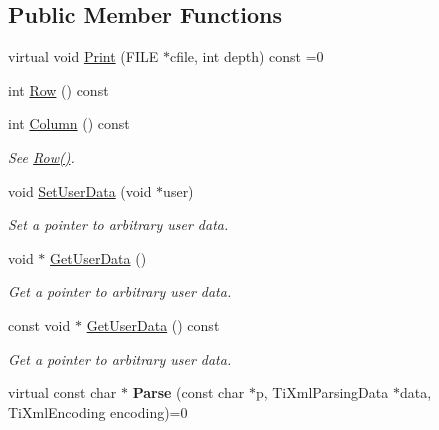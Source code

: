 \subsection*{Public Member Functions}
\begin{DoxyCompactItemize}
\item 
virtual void \hyperlink{class_ti_xml_base_a0de56b3f2ef14c65091a3b916437b512}{Print} (FILE $\ast$cfile, int depth) const =0
\item 
int \hyperlink{class_ti_xml_base_a024bceb070188df92c2a8d8852dd0853}{Row} () const 
\item 
\hypertarget{class_ti_xml_base_ab54bfb9b70fe6dd276e7b279cab7f003}{
int \hyperlink{class_ti_xml_base_ab54bfb9b70fe6dd276e7b279cab7f003}{Column} () const }
\label{class_ti_xml_base_ab54bfb9b70fe6dd276e7b279cab7f003}

\begin{DoxyCompactList}\small\item\em See \hyperlink{class_ti_xml_base_a024bceb070188df92c2a8d8852dd0853}{Row()}. \item\end{DoxyCompactList}\item 
\hypertarget{class_ti_xml_base_ac6b3e0f790930d4970ec30764e937b5d}{
void \hyperlink{class_ti_xml_base_ac6b3e0f790930d4970ec30764e937b5d}{SetUserData} (void $\ast$user)}
\label{class_ti_xml_base_ac6b3e0f790930d4970ec30764e937b5d}

\begin{DoxyCompactList}\small\item\em Set a pointer to arbitrary user data. \item\end{DoxyCompactList}\item 
\hypertarget{class_ti_xml_base_a6559a530ca6763fc301a14d77ed28c17}{
void $\ast$ \hyperlink{class_ti_xml_base_a6559a530ca6763fc301a14d77ed28c17}{GetUserData} ()}
\label{class_ti_xml_base_a6559a530ca6763fc301a14d77ed28c17}

\begin{DoxyCompactList}\small\item\em Get a pointer to arbitrary user data. \item\end{DoxyCompactList}\item 
\hypertarget{class_ti_xml_base_ad0120210e4680ef2088601753ce0ede4}{
const void $\ast$ \hyperlink{class_ti_xml_base_ad0120210e4680ef2088601753ce0ede4}{GetUserData} () const }
\label{class_ti_xml_base_ad0120210e4680ef2088601753ce0ede4}

\begin{DoxyCompactList}\small\item\em Get a pointer to arbitrary user data. \item\end{DoxyCompactList}\item 
\hypertarget{class_ti_xml_base_a00e4edb0219d00a1379c856e5a1d2025}{
virtual const char $\ast$ {\bfseries Parse} (const char $\ast$p, TiXmlParsingData $\ast$data, TiXmlEncoding encoding)=0}
\label{class_ti_xml_base_a00e4edb0219d00a1379c856e5a1d2025}

\end{DoxyCompactItemize}
